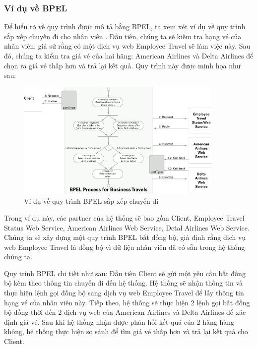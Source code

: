 \subsubsection{Ví dụ về BPEL}

\hspace*{0.5cm} Để hiểu rõ về quy trình được mô tả bằng BPEL, ta xem xét ví dụ về quy trình sắp xếp chuyến đi cho nhân viên \cite{theoryBPEL}. Đầu tiên, chúng ta sẽ kiếm tra hạng vé của nhân viên, giả sử rằng có một dịch vụ web Employee Travel sẽ làm việc này. Sau đó, chúng ta kiểm tra giá vé của hai hãng: American Airlines và Delta Airlines để chọn ra giá vé thấp hơn và trả lại kết quả. Quy trình này được minh họa như sau:

\begin{figure}[!htp]
	\begin{center}
		\includegraphics[width=10cm]{img/theory/BPEL/Sample.png}
	\end{center}
	\caption{Ví dụ về quy trình BPEL sắp xếp chuyến đi \cite{theoryBPEL}}
\end{figure}

Trong ví dụ này, các partner của hệ thống sẽ bao gồm Client, Employee Travel Status Web Service, American Airlines Web Service, Detal Airlines Web Service. Chúng ta sẽ xây dựng một quy trình BPEL bất đồng bộ, giả định rằng dịch vụ web Employee Travel là đồng bộ vì dữ liệu nhân viên đã có sẵn trong hệ thống chúng ta. 

Quy trình BPEL chi tiết như sau: Đầu tiên Client sẽ gửi một yêu cầu bất đồng bộ kèm theo thông tin chuyến đi đến hệ thống. Hệ thống sẽ nhận thông tin và thực hiện lệnh gọi đồng bộ sang dịch vụ web Employee Travel để lấy thông tin hạng vé của nhân viên này. Tiếp theo, hệ thống sẽ thực hiện 2 lệnh gọi bất đồng bộ đồng thời đến 2 dịch vụ web của American Airlines và Delta Airlines để xác định giá vé. Sau khi hệ thống nhận được phản hồi kết quả của 2 hãng hàng không, hệ thống thực hiện so sánh để tìm giá vé thấp hơn và trả lại kết quả cho Client.

